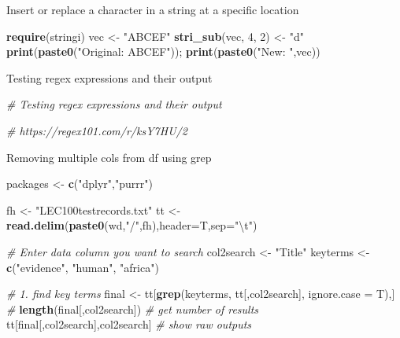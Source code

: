\documentclass[10,portrait]{article}
\newenvironment{Shaded}{\begin{snugshade}}{\end{snugshade}}
\newcommand{\KeywordTok}[1]{\textcolor[rgb]{0.13,0.29,0.53}{\textbf{#1}}}
\newcommand{\DataTypeTok}[1]{\textcolor[rgb]{0.13,0.29,0.53}{#1}}
\newcommand{\DecValTok}[1]{\textcolor[rgb]{0.00,0.00,0.81}{#1}}
\newcommand{\CharTok}[1]{\textcolor[rgb]{0.31,0.60,0.02}{#1}}
\newcommand{\StringTok}[1]{\textcolor[rgb]{0.31,0.60,0.02}{#1}}
\newcommand{\CommentTok}[1]{\textcolor[rgb]{0.56,0.35,0.01}{\textit{#1}}}
\newcommand{\NormalTok}[1]{#1}
\begin{document}
Insert or replace a character in a string at a specific location

\begin{Shaded}
\begin{Highlighting}[]
\KeywordTok{require}\NormalTok{(stringi)}
\NormalTok{vec <-}\StringTok{ "ABCEF"}
\KeywordTok{stri_sub}\NormalTok{(vec, }\DecValTok{4}\NormalTok{, }\DecValTok{2}\NormalTok{) <-}\StringTok{ "d"} 
\KeywordTok{print}\NormalTok{(}\KeywordTok{paste0}\NormalTok{(}\StringTok{"Original: ABCEF"}\NormalTok{)); }\KeywordTok{print}\NormalTok{(}\KeywordTok{paste0}\NormalTok{(}\StringTok{"New: "}\NormalTok{,vec))}
\end{Highlighting}
\end{Shaded}

Testing regex expressions and their output

\begin{Shaded}
\begin{Highlighting}[]
\CommentTok{# Testing regex expressions and their output   }

\CommentTok{# https://regex101.com/r/ksY7HU/2}
\end{Highlighting}
\end{Shaded}

Removing multiple cols from df using grep

\begin{Shaded}
\begin{Highlighting}[]
\NormalTok{packages <-}\StringTok{ }\KeywordTok{c}\NormalTok{(}\StringTok{"dplyr"}\NormalTok{,}\StringTok{"purrr"}\NormalTok{) }

\NormalTok{fh <-}\StringTok{ "LEC100testrecords.txt"}
\NormalTok{tt <-}\StringTok{ }\KeywordTok{read.delim}\NormalTok{(}\KeywordTok{paste0}\NormalTok{(wd,}\StringTok{"/"}\NormalTok{,fh),}\DataTypeTok{header=}\NormalTok{T,}\DataTypeTok{sep=}\StringTok{"}\CharTok{\textbackslash{}t}\StringTok{"}\NormalTok{)}

\CommentTok{# Enter data column you want to search  }
\NormalTok{col2search <-}\StringTok{ "Title"}
\NormalTok{keyterms <-}\StringTok{ }\KeywordTok{c}\NormalTok{(}\StringTok{"evidence"}\NormalTok{, }\StringTok{"human"}\NormalTok{, }\StringTok{"africa"}\NormalTok{)}

\CommentTok{# 1. find key terms}
\NormalTok{final <-}\StringTok{ }\NormalTok{tt[}\KeywordTok{grep}\NormalTok{(keyterms, tt[,col2search], }\DataTypeTok{ignore.case =}\NormalTok{ T),] }\CommentTok{#}
\KeywordTok{length}\NormalTok{(final[,col2search]) }\CommentTok{# get number of results}
\NormalTok{tt[final[,col2search],col2search] }\CommentTok{# show raw outputs }
\end{Highlighting}
\end{Shaded}
\end{document}
